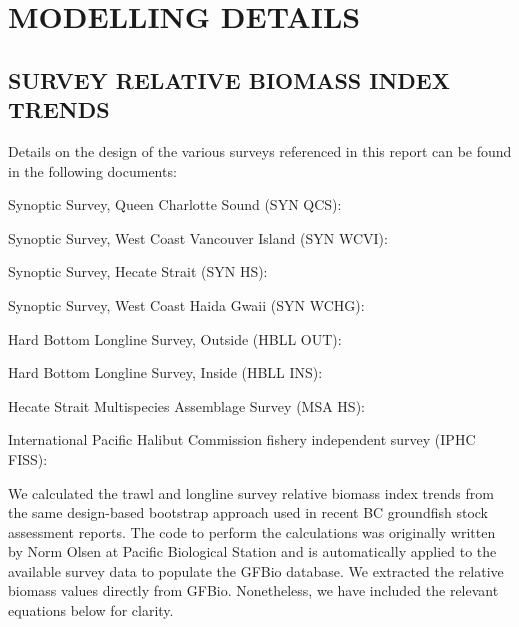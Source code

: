 \documentclass[11pt]{book}\usepackage[]{graphicx}\usepackage[]{color}
\begin{document}
\clearpage

\section{MODELLING DETAILS} \label{sec:modelling-details}


\subsection{SURVEY RELATIVE BIOMASS INDEX TRENDS} \label{sec:survey-trend-models}

Details on the design of the various surveys referenced in this report can be
found in the following documents:

\begin{resdoclist}

\item Synoptic Survey, Queen Charlotte Sound (SYN QCS):  \citep{wyeth2018synqcs}

\item Synoptic Survey, West Coast Vancouver Island (SYN WCVI):
  \citep{wyeth2017synwcvi}

\item Synoptic Survey, Hecate Strait (SYN HS): \citep{wyeth2018synhs}

\item Synoptic Survey, West Coast Haida Gwaii (SYN WCHG):
  \citep{wyeth2018synwchg}

\item Hard Bottom Longline Survey, Outside (HBLL OUT): \citep{dfo2018ifmp}

\item Hard Bottom Longline Survey, Inside (HBLL INS): \citep{lochead2004irf}

\item Hecate Strait Multispecies Assemblage Survey (MSA HS):
  \citep{fargo1984hsmsa,westrheim1984hsmsa}

\item International Pacific Halibut Commission fishery independent survey (IPHC
  FISS): \citep{flemming2012iphc}

\end{resdoclist}

We calculated the trawl and longline survey relative biomass index trends from
the same design-based bootstrap approach used in recent BC groundfish stock
assessment reports. The code to perform the calculations was originally written
by Norm Olsen at Pacific Biological Station and is automatically applied to the
available survey data to populate the GFBio database. We extracted the relative
biomass values directly from GFBio. Nonetheless, we have included the relevant
equations below for clarity.
\end{document}

